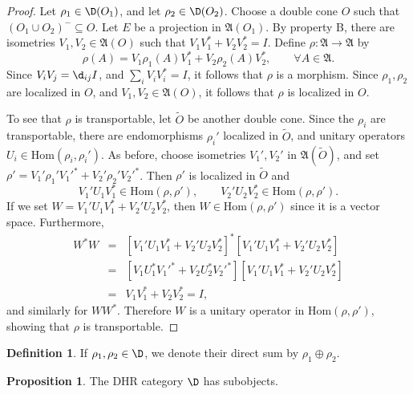 \documentclass[11pt]{article}
\newcommand{\alg}[1]{\mathfrak{#1}}
\theoremstyle{definition}
\newtheorem{prop}[thm]{Proposition}
\theoremstyle{definition}
\newtheorem{defn}[thm]{Definition}
\theoremstyle{remark}
\newcommand{\Hom}{\mathrm{Hom}}
\begin{document}
\begin{proof} Let $\rho _1\in \D (O_1)$, and let $\rho _2 \in \D (O_2)$.  Choose a
  double cone $O$ such that $(O_1\cup O_2)^{-}\subseteq O$.  Let $E$ be a projection
  in $\alg{A}(O_1)$.  By property B, there are isometries $V_1,V_2\in \alg{A}(O)$
  such that $V_1V_1^*+V_2V_2^*=I$.  Define $\rho :\alg{A}\to \alg{A}$ by
  $$ \rho (A)=V_1 \rho _1(A)V_1^*+V_2\rho _2(A)V_2^* ,\qquad \forall A\in \alg{A} .$$
  Since $V_iV_j=\d _{ij}I$, and $\sum _iV_iV_i^*=I$, it follows that $\rho$ is a
  morphism.  Since $\rho _1,\rho _2$ are localized in $O$, and $V_1,V_2\in
  \alg{A}(O)$, it follows that $\rho$ is localized in $O$.

  To see that $\rho$ is transportable, let $\widetilde{O}$ be another double cone.
  Since the $\rho _i$ are transportable, there are endomorphisms $\rho _i'$ localized
  in $\widetilde{O}$, and unitary operators $U_i\in \Hom (\rho _i,\rho _i')$.  As
  before, choose isometries $V_1',V_2'$ in $\alg{A}(\widetilde{O})$, and set $\rho
  '=V_1'\rho _1'{V_1'}^*+V_2'\rho _2'{V_2'}^*$.  Then $\rho '$ is localized in
  $\widetilde{O}$ and
  \begin{equation*} {V_1'}U_1V_1^* \in \Hom (\rho ,\rho ') ,\qquad {V_2'}U_2V_2^* \in
    \Hom (\rho ,\rho ') . \end{equation*} If we set
  $W={V_1'}U_1V_1^*+{V_2'}U_2V_2^*$, then $W\in \Hom (\rho ,\rho ')$ since it is a
  vector space.  Furthermore,
\begin{eqnarray*} W^*W &=&
  [{V_1'}U_1V_1^*+{V_2'}U_2V_2^*]^*[{V_1'}U_1V_1^*+{V_2'}U_2V_2^*]  \\
  &=&
  [V_1U_1^*{V_1'}^*+V_2U_2^*{V_2'}^*] [{V_1'}U_1V_1^*+{V_2'}U_2V_2^*] \\
  &=& V_1V_1^*+V_2V_2^* = I , \end{eqnarray*} and similarly for $WW^*$.  Therefore
$W$ is a unitary operator in $\Hom (\rho ,\rho ')$, showing that $\rho$ is
transportable.
\end{proof}

\begin{defn} If $\rho _1,\rho _2 \in \D$, we denote their direct sum by $\rho
  _1\oplus \rho _2$. \end{defn}

\begin{prop} The DHR category $\D$ has subobjects.  \end{prop}
\end{document}
